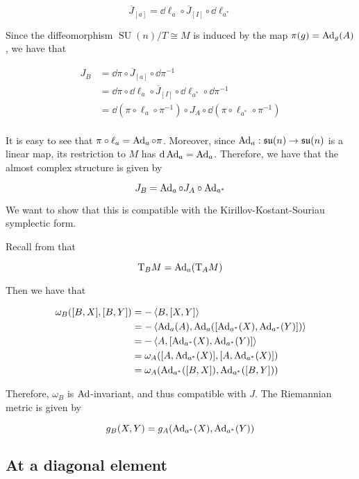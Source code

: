 \documentclass{report}
\DeclareMathOperator{\SU}{SU}
\newcommand{\su}{\mathfrak{su}}
\begin{document}
\begin{equation}
    \label{eq:cx-str-quot}
    \overline J_{[a]} = \dd\ell_a \circ \overline J_{[I]} \circ \dd\ell_{a^*}
\end{equation}

Since the diffeomorphism \(\SU(n)/T \cong M\) is induced by the map \(\pi(g) = \operatorname{Ad}_g(A)\), we have that

\begin{align*}
    J_B &= \dd\pi \circ \overline J_{[a]} \circ \dd\pi^{-1} \\
    &= \dd\pi \circ \dd \ell_a \circ \overline J_{[I]} \circ \dd \ell_{a^*} \circ \dd \pi^{-1} \\
    &= \dd(\pi \circ \ell_a \circ \pi^{-1}) \circ J_A \circ \dd(\pi \circ \ell_{a^*} \circ \pi^{-1}) \\
\end{align*}

It is easy to see that \(\pi \circ \ell_a = \operatorname{Ad}_a \circ \pi\). Moreover, since \(\Ad_a : \su(n) \to \su(n)\) is a linear map, its restriction to \(M\) has \(\dd \operatorname{Ad}_a = \operatorname{Ad}_a\). Therefore, we have that the almost complex structure is given by

\[J_B = \operatorname{Ad}_a \circ J_A \circ \operatorname{Ad}_{a^*}\]

We want to show that this is compatible with the Kirillov-Kostant-Souriau symplectic form.

Recall from that

\[\mathrm{T}_BM = \operatorname{Ad}_a(\mathrm{T}_A M)\]

Then we have that

\begin{align*}
    \omega_B([B, X], [B, Y]) &= -\left\langle B, [X, Y] \right\rangle \\
    &= -\left\langle \operatorname{Ad}_a(A), \operatorname{Ad}_a([\operatorname{Ad}_{a^*}(X), \operatorname{Ad}_{a^*}(Y)]) \right\rangle \\
    &= -\left\langle A, [\operatorname{Ad}_{a^*}(X), \operatorname{Ad}_{a^*}(Y)] \right\rangle \\
    &= \omega_A([A, \operatorname{Ad}_{a^*}(X)], [A, \operatorname{Ad}_{a^*}(X)]) \\
    &= \omega_A(\operatorname{Ad}_{a^*}([B, X]), \operatorname{Ad}_{a^*}([B, Y]))
\end{align*}

Therefore, \(\omega_B\) is \(\operatorname{Ad}\)-invariant, and thus compatible with \(J\). The Riemannian metric is given by

\[g_B(X, Y) = g_A(\operatorname{Ad}_{a^*}(X), \operatorname{Ad}_{a^*}(Y))\]

\subsection{At a diagonal element}
\end{document}
